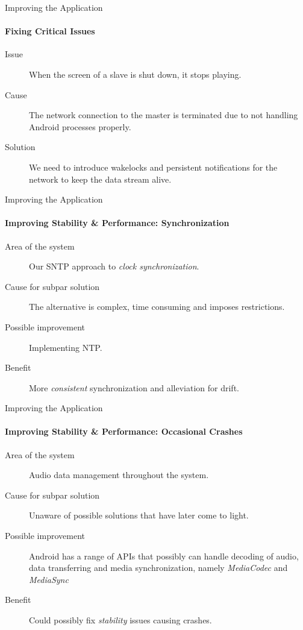 \begin{frame}{Improving the Application}
    \framesubtitle{Fixing Critical Issues}
    \begin{description}
        \item [Issue] When the screen of a slave is shut down, it stops playing.
        \item [Cause] The network connection to the master is terminated due to not handling Android processes properly.
        \item [Solution] We need to introduce wakelocks and persistent notifications for the network to keep the data stream alive.
    \end{description}
\end{frame}

\begin{frame}{Improving the Application}
    \framesubtitle{Improving Stability \& Performance: Synchronization}
    \begin{description}
        \item [Area of the system] Our SNTP approach to \textit{clock synchronization}.
        \item [Cause for subpar solution] The alternative is complex, time consuming and imposes restrictions.
        \item [Possible improvement] Implementing NTP.
        \item [Benefit] More \textit{consistent} synchronization and alleviation for drift.
    \end{description}
\end{frame}

\begin{frame}{Improving the Application}
    \framesubtitle{Improving Stability \& Performance: Occasional Crashes}
    \begin{description}
        \item [Area of the system] Audio data management throughout the system.
        \item [Cause for subpar solution] Unaware of possible solutions that have later come to light.
        \item [Possible improvement] Android has a range of APIs that possibly can handle decoding of audio, data transferring and media synchronization, namely \textit{MediaCodec} and \textit{MediaSync}
        \item [Benefit] Could possibly fix \textit{stability} issues causing crashes.
    \end{description}
\end{frame}

